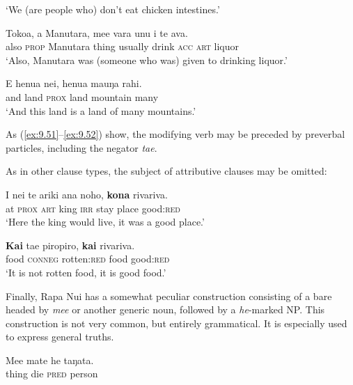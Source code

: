 \glt 
‘We (are people who) don’t eat chicken intestines.’ \textstyleExampleref{[Ley-8-53.008]}
\z

\ea\label{ex:9.52}
\gll Toko{\ꞌ}a, a Manutara, me{\ꞌ}e vara unu i te {\ꞌ}ava. \\
also \textsc{prop} Manutara thing usually drink \textsc{acc} \textsc{art} liquor \\

\glt 
‘Also, Manutara was (someone who was) given to drinking liquor.’ \textstyleExampleref{[R309.055]} 
\z

\ea\label{ex:9.53}
\gll {\ꞌ}E henua nei, henua ma{\ꞌ}uŋa rahi. \\
and land \textsc{prox} land mountain many \\

\glt
‘And this land is a land of many mountains.’ \textstyleExampleref{[R348.004]} 
\z

As (\ref{ex:9.51}–\ref{ex:9.52}) show, the modifying verb may be preceded by preverbal particles, including the negator \textit{ta{\ꞌ}e}.

As in other clause types, the subject of attributive clauses may be omitted:

\ea\label{ex:9.54}
\gll {\ꞌ}I nei te {\ꞌ}ariki ana noho, \textbf{kona} rivariva. \\
at \textsc{prox} \textsc{art} king \textsc{irr} stay place good:\textsc{red} \\

\glt 
‘Here the king would live, it was a good place.’ \textstyleExampleref{[Mtx-2-01.031]}
\z

\ea\label{ex:9.55}
\gll \textbf{Kai} ta{\ꞌ}e piropiro, \textbf{kai} rivariva. \\
food \textsc{conneg} rotten:\textsc{red} food good:\textsc{red} \\

\glt 
‘It is not rotten food, it is good food.’ \textstyleExampleref{[R310.382]} 
\z

Finally, Rapa Nui has a somewhat peculiar construction consisting of a bare  headed by \textit{me{\ꞌ}e} or another generic noun, followed by a \textit{he}{}-marked NP. This construction is not very common, but entirely grammatical. It is especially used to express general truths.

\ea\label{ex:9.56}
\gll Me{\ꞌ}e mate he taŋata. \\
thing die \textsc{pred} person \\

